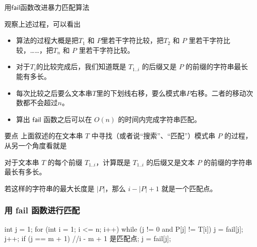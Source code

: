 \documentclass{ctexbeamer}
\newcommand{\fail}{\mathsf{fail}}
\begin{document}
\begin{frame}{用$\fail$函数改进暴力匹配算法}

观察上述过程，可以看出

\begin{itemize}
    \item 算法的过程大概是把$T_1$ 和 $P$里若干字符比较，把$T_2$ 和 $P$ 里若干字符比较，……，把$T_n$ 和 $P$ 里若干字符比较。
    \item 对于$T_i$的比较完成后，我们知道既是 $T_{1..i}$ 的后缀又是 $P$ 的前缀的字符串最长能有多长。
    \item 每次比较之后要么文本串$T$里的下划线右移，要么模式串$P$右移。二者的移动次数都不会超过$n$。
    \item 算出 $\fail$ 函数之后可以在 $O(n)$ 的时间内完成字符串匹配。
\end{itemize}

\tcbox{如何计算$\fail$函数？}
\end{frame}

\begin{frame}{要点}
  上面叙述的在文本串 $T$ 中寻找（或者说“搜索”、“匹配”）模式串 $P$ 的过程，从另一个角度看就是
  \begin{tcolorbox}
    对于文本串 $T$ 的每个前缀 $T_{1..i}$，计算既是 $T_{1..i}$ 的后缀又是文本 $P$ 的前缀的字符串最长有多长。
    
    若这样的字符串的最大长度是 $|P|$，那么 $i-|P| + 1$ 就是一个匹配点。
  \end{tcolorbox}
\end{frame}



\begin{frame}[fragile]
  \frametitle{用 fail 函数进行匹配}

  \begin{tcolorbox}
    \begin{cverb}[fontsize=\normalsize]
  int j = 1;
  for (int i = 1; i <= n; i++) {
    while (j != 0 and P[j] != T[i])
      j = fail[j];
    j++;
    if (j == m + 1) {
      //i - m + 1 是匹配点;
      j = fail[j];
    }
  }
    \end{cverb}
    \end{tcolorbox}

\end{frame}
\end{document}
